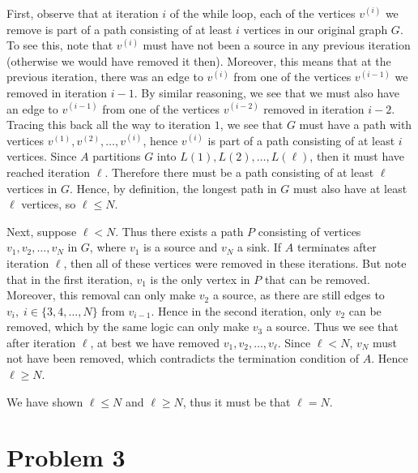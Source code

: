 \documentclass{article}
\begin{document}
First, observe that at iteration $i$ of the while loop, each of the vertices $v^{(i)}$ we remove is part of a path consisting of at least $i$ vertices in our original graph $G$. To see this, note that $v^{(i)}$ must have not been a source in any previous iteration (otherwise we would have removed it then). Moreover, this means that at the previous iteration, there was an edge to $v^{(i)}$ from one of the vertices $v^{(i-1)}$ we removed in iteration $i-1$. By similar reasoning, we see that we must also have an edge to $v^{(i-1)}$ from one of the vertices $v^{(i-2)}$ removed in iteration $i-2$. Tracing this back all the way to iteration $1$, we see that $G$ must have a path with vertices $v^{(1)}, v^{(2)}, \dots, v^{(i)}$, hence $v^{(i)}$ is part of a path consisting of at least $i$ vertices. Since $A$ partitions $G$ into $L(1),L(2),\dots,L(\ell)$, then it must have reached iteration $\ell$. Therefore there must be a path consisting of at least $\ell$ vertices in $G$. Hence, by definition, the longest path in $G$ must also have at least $\ell$ vertices, so $\ell \leq N$.

Next, suppose $\ell < N$. Thus there exists a path $P$ consisting of vertices $v_1,v_2,\dots,v_N$ in $G$, where $v_1$ is a source and $v_N$ a sink. If $A$ terminates after iteration $\ell$, then all of these vertices were removed in these iterations. But note that in the first iteration, $v_1$ is the only vertex in $P$ that can be removed. Moreover, this removal can only make $v_2$ a source, as there are still edges to $v_i,\; i \in \{3,4,\dots,N\}$ from $v_{i-1}$. Hence in the second iteration, only $v_2$ can be removed, which by the same logic can only make $v_3$ a source. Thus we see that after iteration $\ell$, at best we have removed $v_1,v_2,\dots,v_{\ell}$. Since $\ell < N$, $v_N$ must not have been removed, which contradicts the termination condition of $A$. Hence $\ell \geq N$.

We have shown $\ell \leq N$ and $\ell \geq N$, thus it must be that $\ell = N$.

\newpage

\section*{Problem 3}
\end{document}
